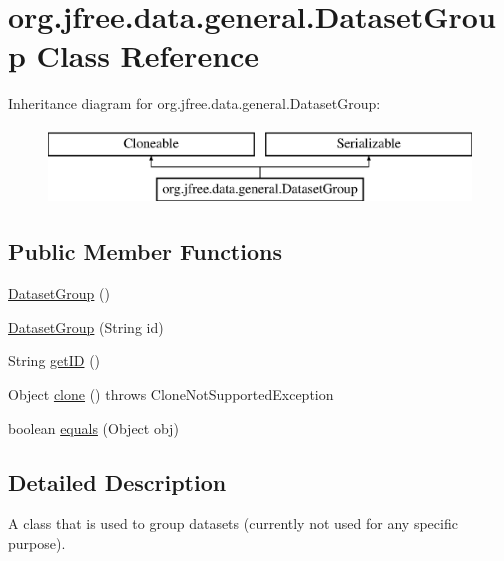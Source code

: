 \hypertarget{classorg_1_1jfree_1_1data_1_1general_1_1_dataset_group}{}\section{org.\+jfree.\+data.\+general.\+Dataset\+Group Class Reference}
\label{classorg_1_1jfree_1_1data_1_1general_1_1_dataset_group}
Inheritance diagram for org.\+jfree.\+data.\+general.\+Dataset\+Group\+:\begin{figure}[H]
\begin{center}
\leavevmode
\includegraphics[height=2.000000cm]{classorg_1_1jfree_1_1data_1_1general_1_1_dataset_group}
\end{center}
\end{figure}
\subsection*{Public Member Functions}
\begin{DoxyCompactItemize}
\item 
\mbox{\hyperlink{classorg_1_1jfree_1_1data_1_1general_1_1_dataset_group_a885fd1dfaf52e368f2bd1bcf1d937000}{Dataset\+Group}} ()
\item 
\mbox{\hyperlink{classorg_1_1jfree_1_1data_1_1general_1_1_dataset_group_a21db8664a1c2522784fc939c2abb4d6f}{Dataset\+Group}} (String id)
\item 
String \mbox{\hyperlink{classorg_1_1jfree_1_1data_1_1general_1_1_dataset_group_abbebf6719be3a55ec339d956a962f9b7}{get\+ID}} ()
\item 
Object \mbox{\hyperlink{classorg_1_1jfree_1_1data_1_1general_1_1_dataset_group_adf57d903aae8f0139f9db44cd092fa07}{clone}} ()  throws Clone\+Not\+Supported\+Exception 
\item 
boolean \mbox{\hyperlink{classorg_1_1jfree_1_1data_1_1general_1_1_dataset_group_a71c6913234fd2075143dd854eeb4d5b1}{equals}} (Object obj)
\end{DoxyCompactItemize}


\subsection{Detailed Description}
A class that is used to group datasets (currently not used for any specific purpose). 

